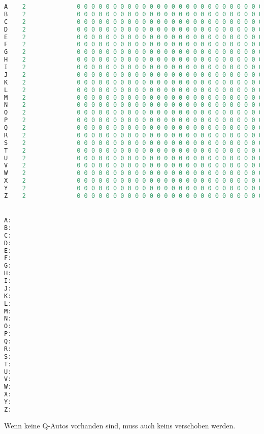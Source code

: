 \documentclass[a4paper,10pt,ngerman]{scrartcl}
\begin{document}
\begin{lstlisting}[language=C++]
A    2              0 0 0 0 0 0 0 0 0 0 0 0 0 0 0 0 0 0 0 0 0 0 0 0 0 0
B    2              0 0 0 0 0 0 0 0 0 0 0 0 0 0 0 0 0 0 0 0 0 0 0 0 0 0
C    2              0 0 0 0 0 0 0 0 0 0 0 0 0 0 0 0 0 0 0 0 0 0 0 0 0 0
D    2              0 0 0 0 0 0 0 0 0 0 0 0 0 0 0 0 0 0 0 0 0 0 0 0 0 0
E    2              0 0 0 0 0 0 0 0 0 0 0 0 0 0 0 0 0 0 0 0 0 0 0 0 0 0
F    2              0 0 0 0 0 0 0 0 0 0 0 0 0 0 0 0 0 0 0 0 0 0 0 0 0 0
G    2              0 0 0 0 0 0 0 0 0 0 0 0 0 0 0 0 0 0 0 0 0 0 0 0 0 0
H    2              0 0 0 0 0 0 0 0 0 0 0 0 0 0 0 0 0 0 0 0 0 0 0 0 0 0
I    2              0 0 0 0 0 0 0 0 0 0 0 0 0 0 0 0 0 0 0 0 0 0 0 0 0 0
J    2              0 0 0 0 0 0 0 0 0 0 0 0 0 0 0 0 0 0 0 0 0 0 0 0 0 0
K    2              0 0 0 0 0 0 0 0 0 0 0 0 0 0 0 0 0 0 0 0 0 0 0 0 0 0
L    2              0 0 0 0 0 0 0 0 0 0 0 0 0 0 0 0 0 0 0 0 0 0 0 0 0 0
M    2              0 0 0 0 0 0 0 0 0 0 0 0 0 0 0 0 0 0 0 0 0 0 0 0 0 0
N    2              0 0 0 0 0 0 0 0 0 0 0 0 0 0 0 0 0 0 0 0 0 0 0 0 0 0
O    2              0 0 0 0 0 0 0 0 0 0 0 0 0 0 0 0 0 0 0 0 0 0 0 0 0 0
P    2              0 0 0 0 0 0 0 0 0 0 0 0 0 0 0 0 0 0 0 0 0 0 0 0 0 0
Q    2              0 0 0 0 0 0 0 0 0 0 0 0 0 0 0 0 0 0 0 0 0 0 0 0 0 0
R    2              0 0 0 0 0 0 0 0 0 0 0 0 0 0 0 0 0 0 0 0 0 0 0 0 0 0
S    2              0 0 0 0 0 0 0 0 0 0 0 0 0 0 0 0 0 0 0 0 0 0 0 0 0 0
T    2              0 0 0 0 0 0 0 0 0 0 0 0 0 0 0 0 0 0 0 0 0 0 0 0 0 0
U    2              0 0 0 0 0 0 0 0 0 0 0 0 0 0 0 0 0 0 0 0 0 0 0 0 0 0
V    2              0 0 0 0 0 0 0 0 0 0 0 0 0 0 0 0 0 0 0 0 0 0 0 0 0 0
W    2              0 0 0 0 0 0 0 0 0 0 0 0 0 0 0 0 0 0 0 0 0 0 0 0 0 0
X    2              0 0 0 0 0 0 0 0 0 0 0 0 0 0 0 0 0 0 0 0 0 0 0 0 0 0
Y    2              0 0 0 0 0 0 0 0 0 0 0 0 0 0 0 0 0 0 0 0 0 0 0 0 0 0
Z    2              0 0 0 0 0 0 0 0 0 0 0 0 0 0 0 0 0 0 0 0 0 0 0 0 0 0


A:
B:
C:
D:
E:
F:
G:
H:
I:
J:
K:
L:
M:
N:
O:
P:
Q:
R:
S:
T:
U:
V:
W:
X:
Y:
Z:
\end{lstlisting}
Wenn keine Q-Autos vorhanden sind, muss auch keins verschoben werden.
\end{document}
